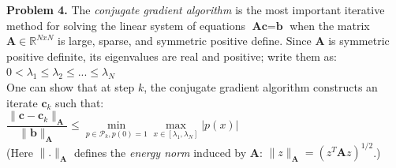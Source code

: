 \documentclass[14pt,a4paper]{article}
\begin{document}
\label{Problem 4}
\large\textbf{Problem 4.} The \textit{conjugate gradient algorithm} is the most important iterative method for solving the linear system of equations $\textbf{Ac} = \textbf{b}$ when the matrix $\textbf{A} \in \mathbb{R}^{NxN}$ is large, sparse, and symmetric positive define. Since \textbf{A} is symmetric positive definite, its eigenvalues are real and positive; write them as: $0 < \lambda_1 \leq \lambda_2 \leq ... \leq \lambda_N$\\ 
One can show that at step $k$, the conjugate gradient algorithm constructs an iterate $\textbf{c}_k$ such that:\\
\hspace*{4cm} $ \dfrac{\|\textbf{c} - \textbf{c}_k\|_{\textbf{A}}}{\|\textbf{b}\|_{\textbf{A}}} \leq \min\limits_{p \in \mathcal{P}_k,p(0) =1} \max\limits_{x\in[\lambda_1,\lambda_N]} |p(x)|$\\
(Here $\|.\|_{\textbf{A}}$ defines the \textit{energy norm} induced by \textbf{A}: $\|z\|_{\textbf{A}} = (z^T\textbf{A}z)^{1/2}$.)
\end{document}
